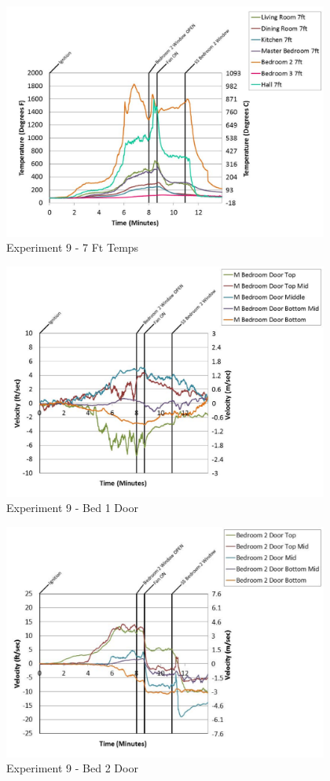 \documentclass{article}
\begin{document}
\begin{appendices}
	\begin{figure}[h!]
		\centering
		\includegraphics[height=3.05in]{0_Images/Results_Charts/Exp_9_Charts/7FtTemps.pdf}
		\caption{Experiment 9 - 7 Ft Temps}
	\end{figure}
 
	\clearpage

	\begin{figure}[h!]
		\centering
		\includegraphics[height=3.05in]{0_Images/Results_Charts/Exp_9_Charts/Bed1Door.pdf}
		\caption{Experiment 9 - Bed 1 Door}
	\end{figure}
 

	\begin{figure}[h!]
		\centering
		\includegraphics[height=3.05in]{0_Images/Results_Charts/Exp_9_Charts/Bed2Door.pdf}
		\caption{Experiment 9 - Bed 2 Door}
	\end{figure}
 

\end{appendices}
\end{document}
